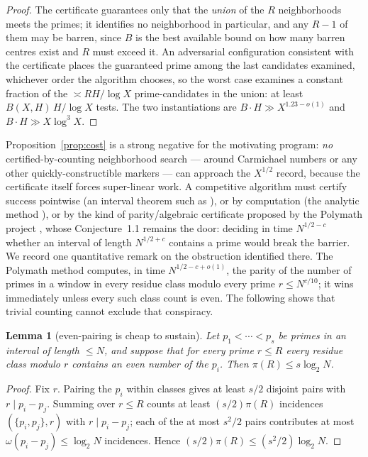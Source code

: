 \documentclass[11pt]{amsart}
\newtheorem{lemma}[theorem]{Lemma}
\begin{document}
\begin{proof}
The certificate guarantees only that the \emph{union} of the $R$
neighborhoods meets the primes; it identifies no neighborhood in particular,
and any $R - 1$ of them may be barren, since $B$ is the best available bound
on how many barren centres exist and $R$ must exceed it. An adversarial
configuration consistent with the certificate places the guaranteed prime
among the last candidates examined, whichever order the algorithm chooses, so
the worst case examines a constant fraction of the
$\asymp R H/\log X$ prime-candidates in the union: at least
$B(X,H)\, H/\log X$ tests. The two instantiations are
$B \cdot H \gg X^{1.23-o(1)}$ and $B \cdot H \gg X \log^{3} X$.
\end{proof}

Proposition~\ref{prop:cost} is a strong negative for the motivating program:
\emph{no} certified-by-counting neighborhood search --- around Carmichael
numbers or any other quickly-constructible markers --- can approach the
$X^{1/2}$ record, because the certificate itself forces super-linear work. A
competitive algorithm must certify success pointwise (an interval theorem such
as \cite{BHP}), or by computation (the analytic method \cite{LO}), or by the
kind of parity/algebraic certificate proposed by the Polymath project
\cite{Pol}, whose Conjecture~1.1 remains the door: deciding in time
$N^{1/2-c}$ whether an interval of length $N^{1/2+c}$ contains a prime would
break the barrier. We record one quantitative remark on the obstruction
identified there. The Polymath method computes, in time $N^{1/2-c+o(1)}$, the
parity of the number of primes in a window in every residue class modulo every
prime $r \le N^{c/10}$; it wins immediately unless every such class count is
even. The following shows that trivial counting cannot exclude that
conspiracy.

\begin{lemma}[even-pairing is cheap to sustain]
\label{lem:pairing}
Let $p_1 < \cdots < p_s$ be primes in an interval of length $\le N$, and
suppose that for every prime $r \le R$ every residue class modulo $r$
contains an even number of the $p_i$. Then $\pi(R) \le s \log_2 N$.
\end{lemma}

\begin{proof}
Fix $r$. Pairing the $p_i$ within classes gives at least $s/2$ disjoint
pairs with $r \mid p_i - p_j$. Summing over $r \le R$ counts at least
$(s/2)\pi(R)$ incidences $(\{p_i, p_j\}, r)$ with $r \mid p_i - p_j$; each of
the at most $s^2/2$ pairs contributes at most $\omega(p_i - p_j) \le \log_2 N$
incidences. Hence $(s/2)\pi(R) \le (s^2/2)\log_2 N$.
\end{proof}
\end{document}
